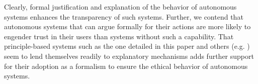 \documentclass[letterpaper]{article} %
\begin{document}
Clearly, formal justification and explanation of the behavior of autonomous systems enhances the transparency of such systems.  Further, we contend that autonomous systems that can argue formally for their actions are more likely to engender trust in their users than systems without such a capability. That principle-based systems such as the one detailed in this paper and others (e.g. \cite{VANDERELST201856,sarathyetal2017coginfocom}) seem to lend themselves readily to explanatory mechanisms adds further support for their adoption as a formalism to ensure the ethical behavior of autonomous systems. 
















\end{document}
